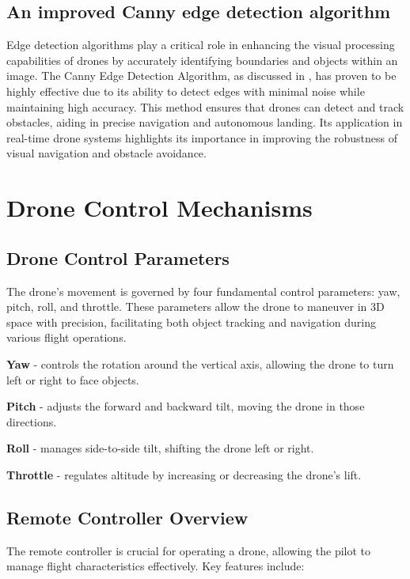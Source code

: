 \documentclass[unnumsec,webpdf,modern,large]{mam-authoring-template}%
\begin{document}
\subsection{An improved Canny edge detection algorithm}
Edge detection algorithms play a critical role in enhancing the visual processing capabilities of drones by accurately identifying boundaries and objects within an image. The Canny Edge Detection Algorithm, as discussed in \cite{rong2014improved}, has proven to be highly effective due to its ability to detect edges with minimal noise while maintaining high accuracy. This method ensures that drones can detect and track obstacles, aiding in precise navigation and autonomous landing. Its application in real-time drone systems highlights its importance in improving the robustness of visual navigation and obstacle avoidance.

\section{Drone Control Mechanisms} \label{sec:mechanisms}
\subsection{Drone Control Parameters}
The drone’s movement is governed by four fundamental control parameters: yaw, pitch, roll, and throttle.
These parameters allow the drone to maneuver in 3D space with precision, facilitating both object tracking and navigation during various flight operations.

\textbf{Yaw} - controls the rotation around the vertical axis, allowing the drone to turn left or right to face objects.

\textbf{Pitch} - adjusts the forward and backward tilt, moving the drone in those directions.

\textbf{Roll} - manages side-to-side tilt, shifting the drone left or right.

\textbf{Throttle} - regulates altitude by increasing or decreasing the drone’s lift.

\subsection{Remote Controller Overview} \label{sec:RemoteControllerOverview}

The remote controller is crucial for operating a drone, allowing the pilot to manage flight characteristics effectively. Key features include:
\end{document}
